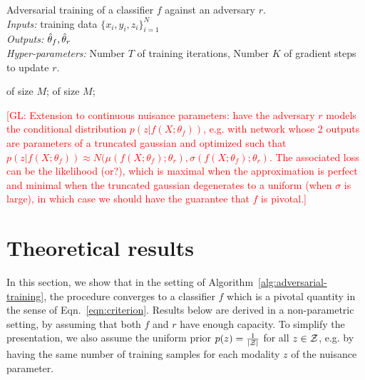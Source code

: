 \documentclass{article}
\newcommand{\glnote}[1]{\textcolor{red}{[GL: #1]}}
\theoremstyle{plain}
\begin{document}
\begin{algorithm}
\caption{Adversarial training of a classifier $f$ against an adversary $r$.\\
{\it Inputs:} training data $\{ x_i, y_i, z_i \}_{i=1}^N$\\
{\it Outputs:} $\smash{\hat\theta_f}, \smash{\hat\theta_r}$\\
{\it Hyper-parameters:} Number $T$ of training iterations, Number $K$ of gradient steps to update $r$.}
\label{alg:adversarial-training}
\begin{algorithmic}[1]
         
             of size $M$;
        \EndFor
         of size $M$; 
    \EndFor
\end{algorithmic}
\end{algorithm}

\glnote{Extension to continuous nuisance parameters: have the adversary $r$
models the conditional distribution $p(z|f(X;\theta_f))$, e.g. with network
whose 2 outputs are parameters of a truncated gaussian and optimized such that
$p(z|f(X;\theta_f)) \approx N(\mu(f(X;\theta_f);\theta_r), \sigma(f(X;\theta_f);
\theta_r)$. The associated loss can be the likelihood (or?), which is maximal when the
approximation is perfect and minimal when the truncated gaussian degenerates to
a uniform (when $\sigma$ is large), in which case we should have the guarantee
that $f$ is pivotal.}



\section{Theoretical results}

In this section, we show that in the setting of
Algorithm~\ref{alg:adversarial-training}, the procedure converges to a
classifier $f$ which is a pivotal quantity in the sense of
Eqn.~\ref{eqn:criterion}. Results below are derived in a non-parametric setting,
by assuming that both $f$ and $r$ have enough capacity. To simplify the
presentation, we also assume the uniform prior $p(z) =
\frac{1}{|{\cal Z}|}$ for all $z \in {\cal Z}$, e.g. by having the same
number of training samples for each modality $z$ of the nuisance
parameter.
\end{document}
